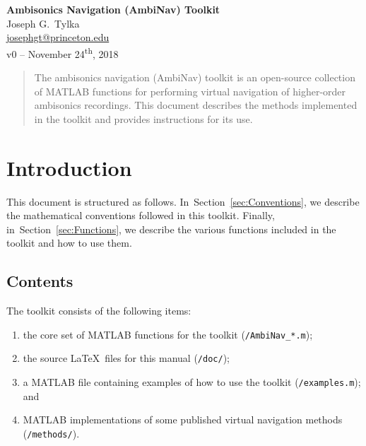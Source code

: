 \documentclass[11pt, oneside]{article}
\newcommand{\secref}[1]{Section~\ref{#1}}
\begin{document}
\begin{centering}
{\Large \textbf{Ambisonics Navigation (AmbiNav) Toolkit}}\\
\vspace{\baselineskip}
Joseph G.~Tylka\\
\href{mailto:josephgt@princeton.edu}{josephgt@princeton.edu}\\
\vspace{\baselineskip}
v0 -- November 24\textsuperscript{th}, 2018\\
\end{centering}

\begin{abstract}
The ambisonics navigation (AmbiNav) toolkit is an open-source collection of MATLAB functions for performing virtual navigation of higher-order ambisonics recordings.
This document describes the methods implemented in the toolkit and provides instructions for its use.
\end{abstract}

\section{Introduction}
This document is structured as follows.
In~\secref{sec:Conventions}, we describe the mathematical conventions followed in this toolkit.
Finally, in~\secref{sec:Functions}, we describe the various functions included in the toolkit and how to use them.

\subsection{Contents}
The toolkit consists of the following items:
\begin{enumerate}
\item the core set of MATLAB functions for the toolkit (\texttt{/AmbiNav\_*.m});
\item the source \LaTeX~files for this manual (\texttt{/doc/});
\item a MATLAB file containing examples of how to use the toolkit (\texttt{/examples.m}); and
\item MATLAB implementations of some published virtual navigation methods (\texttt{/methods/}).
\end{enumerate}

\end{document}
